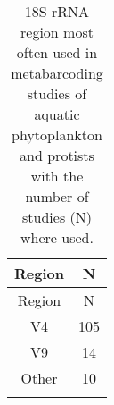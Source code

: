 \begin{longtable}{cc}
\caption{18S rRNA region most often used in metabarcoding studies of aquatic phytoplankton and protists with the number of studies (N) where used.} \\ 
  \hline
  Region & N \\
 \endfirsthead 
 \hline 
 Region & N \\
 \hline 
 \endhead 
 \hline 
 \endfoot 
  \endlastfoot 
 \hline
V4 & 105 \\ 
  V9 & 14 \\ 
  Other & 10 \\ 
   \hline
\hline
\label{tab:region}
\end{longtable}
